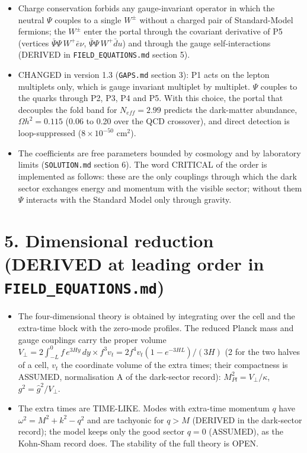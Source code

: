 \documentclass[11pt]{article}
\begin{document}
\begin{itemize}
\item Charge conservation forbids any gauge-invariant operator in which the neutral $\Psi$ couples to a single $W^\pm$ without a charged pair of Standard-Model fermions; the $W^\pm$ enter the portal through the covariant derivative of P5 (vertices $\bar\Psi\Psi\,W^+\bar e\nu$, $\bar\Psi\Psi\,W^+\bar d u$) and through the gauge self-interactions (DERIVED in \texttt{FIELD\_\allowbreak{}EQUATIONS.\allowbreak{}md} section 5).
\item CHANGED in version 1.3 (\texttt{GAPS.\allowbreak{}md} section 3): P1 acts on the lepton multiplets only, which is gauge invariant multiplet by multiplet. $\Psi$ couples to the quarks through P2, P3, P4 and P5. With this choice, the portal that decouples the fold band for $N_{eff} = 2.99$ predicts the dark-matter abundance, $\Omega h^2 = 0.115$ (0.06 to 0.20 over the QCD crossover), and direct detection is loop-suppressed ($8\times10^{-50}$ cm$^2$).
\item The coefficients are free parameters bounded by cosmology and by laboratory limits (\texttt{SOLUTION.\allowbreak{}md} section 6). The word CRITICAL of the order is implemented as follows: these are the only couplings through which the dark sector exchanges energy and momentum with the visible sector; without them $\Psi$ interacts with the Standard Model only through gravity.
\end{itemize}

\section*{5. Dimensional reduction (DERIVED at leading order in \texttt{FIELD\_\allowbreak{}EQUATIONS.\allowbreak{}md})}

\begin{itemize}
\item The four-dimensional theory is obtained by integrating over the cell and the extra-time block with the zero-mode profiles. The reduced Planck mass and gauge couplings carry the proper volume $V_\perp = 2\int_{-L}^{0} f\,e^{3Hy}\,dy \times f^3 v_t = 2 f^4 v_t (1 - e^{-3HL})/(3H)$ (2 for the two halves of a cell, $v_t$ the coordinate volume of the extra times; their compactness is ASSUMED, normalisation A of the dark-sector record): $M_{Pl}^2 = V_\perp/\kappa$, $g^2 = \hat g^2/V_\perp$.
\item The extra times are TIME-LIKE. Modes with extra-time momentum $q$ have $\omega^2 = M^2 + k^2 - q^2$ and are tachyonic for $q > M$ (DERIVED in the dark-sector record); the model keeps only the good sector $q = 0$ (ASSUMED), as the Kohn-Sham record does. The stability of the full theory is OPEN.
\end{itemize}
\end{document}
